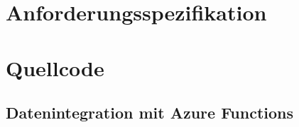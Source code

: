 \chapter{Anforderungsspezifikation} \label{ch:anforderungsspezifikation}



\chapter{Quellcode} \label{ch:quellcode}
\section{Datenintegration mit Azure Functions}
